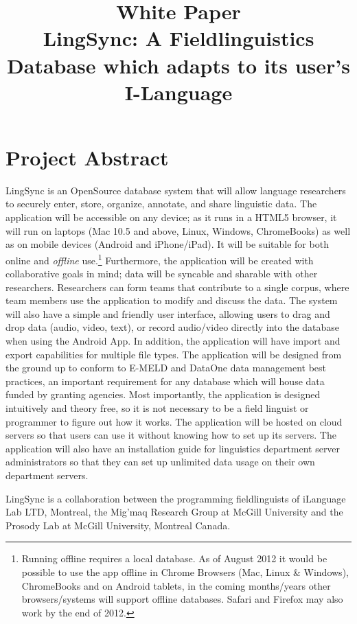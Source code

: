 \documentclass[12pt]{article}
\title{White Paper \\ LingSync: A Fieldlinguistics Database which adapts to its user's I-Language}
\author{}
\date{}
\begin{document}
\maketitle{} 

\tableofcontents

\section {Project Abstract}

LingSync is an OpenSource database system that will allow language researchers to securely enter, store, organize, annotate, and share linguistic data. The application will be accessible on any device; as it runs in a HTML5 browser, it will run on laptops (Mac  10.5 and above, Linux, Windows, ChromeBooks) as well as on mobile devices (Android and iPhone/iPad).  It will be suitable for both online and \emph{offline} use.\footnote{Running offline requires  a local database. As of August 2012 it would be possible to use the app offline in Chrome Browsers (Mac, Linux \& Windows), ChromeBooks and on Android tablets, in the coming months/years other browsers/systems will support offline databases. Safari and Firefox may also work by the end of 2012.}  Furthermore, the application will be created with collaborative goals in mind;  data will be syncable and sharable with other researchers.  Researchers can form teams that contribute to a single corpus, where team members use the application to modify and discuss the data. The system will also have a simple and friendly user interface, allowing users to drag and drop data (audio, video, text), or record audio/video directly into the database when using the Android App. In addition, the application will have import and export capabilities for multiple file types. The application will be designed from the ground up to conform to E-MELD and DataOne data management best practices, an important requirement for any database which will house data funded by granting agencies.  Most importantly, the application is designed intuitively and theory free, so it is not necessary to be a field linguist or programmer to figure out how it works. The application will be hosted on cloud servers so that users can use it without knowing how to set up its servers. The application will also have an installation guide for linguistics department server administrators so that they can set up unlimited data usage on their own department servers.


LingSync is a collaboration between  the programming fieldlinguists of iLanguage Lab LTD, Montreal, the Mig'maq Research Group at McGill University and the Prosody Lab at McGill University, Montreal Canada.
\end{document}
